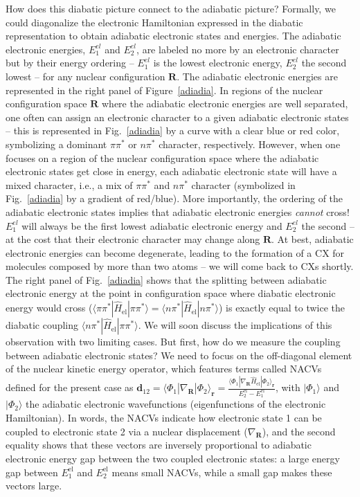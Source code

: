 \documentclass[9pt,bestpractices]{livecoms}
\newcommand{\bs}{\mathbf}
\begin{document}
How does this diabatic picture connect to the adiabatic picture? Formally, we could diagonalize the electronic Hamiltonian expressed in the diabatic representation to obtain adiabatic electronic states and energies. The adiabatic electronic energies, $E_1^{\textit{el}}$ and $E_2^{\textit{el}}$, are labeled no more by an electronic character but by their energy ordering --  $E_1^{\textit{el}}$ is the lowest electronic energy, $E_2^{\textit{el}}$ the second lowest -- for any nuclear configuration $\mathbf{R}$. The adiabatic electronic energies are represented in the right panel of Figure~\ref{adiadia}. In regions of the nuclear configuration space $\mathbf{R}$ where the adiabatic electronic energies are well separated, one often can assign an electronic character to a given adiabatic electronic states -- this is represented in Fig.~\ref{adiadia} by a curve with a clear blue or red color, symbolizing a dominant $\pi\pi^\ast$ or $n\pi^\ast$ character, respectively. However, when one focuses on a region of the nuclear configuration space where the adiabatic electronic states get close in energy, each adiabatic electronic state will have a mixed character, i.e., a mix of $\pi\pi^\ast$ and $n\pi^\ast$ character (symbolized in Fig.~\ref{adiadia} by a gradient of red/blue). More importantly, the ordering of the adiabatic electronic states implies that adiabatic electronic energies \textit{cannot} cross! $E_1^{\textit{el}}$ will always be the first lowest adiabatic electronic energy and $E_2^{\textit{el}}$ the second -- at the cost that their electronic character may change along $\mathbf{R}$. At best, adiabatic electronic energies can become degenerate, leading to the formation of a CX for molecules composed by more than two atoms -- we will come back to CXs shortly. The right panel of Fig.~\ref{adiadia} shows that the splitting between adiabatic electronic energy at the point in configuration space where diabatic electronic energy would cross ($\langle \pi\pi^\ast | \hat{H}_{\text{el}} | \pi\pi^\ast\rangle = \langle n\pi^\ast | \hat{H}_{\text{el}} | n\pi^\ast\rangle$) is exactly equal to twice the diabatic coupling $\langle n\pi^\ast | \hat{H}_{\text{el}} | \pi\pi^\ast\rangle$. We will soon discuss the implications of this observation with two limiting cases. But first, how do we measure the coupling between adiabatic electronic states? We need to focus on the off-diagonal element of the nuclear kinetic energy operator, which features terms called NACVs defined for the present case as $\mathbf{d}_{12} = \langle \Phi_1| \nabla_{\mathbf{R}}| \Phi_2 \rangle_{\bs r} = \frac{\langle \Phi_1| \nabla_{\mathbf{R}}\hat{H}_{\text{el}}| \Phi_2 \rangle_{\bs r} }{E_2^{\text{el}}-E_1^{\text{el}}}$, with $|\Phi_1\rangle$ and $|\Phi_2\rangle$ the adiabatic electronic wavefunctions (eigenfunctions of the electronic Hamiltonian). In words, the NACVs indicate how electronic state 1 can be coupled to electronic state 2 via a nuclear displacement ($\nabla_{\mathbf{R}}$), and the second equality shows that these vectors are inversely proportional to adiabatic electronic energy gap between the two coupled electronic states: a large energy gap between $E_1^{\text{el}}$ and $E_2^{\text{el}}$ means small NACVs, while a small gap makes these vectors large.
\end{document}
